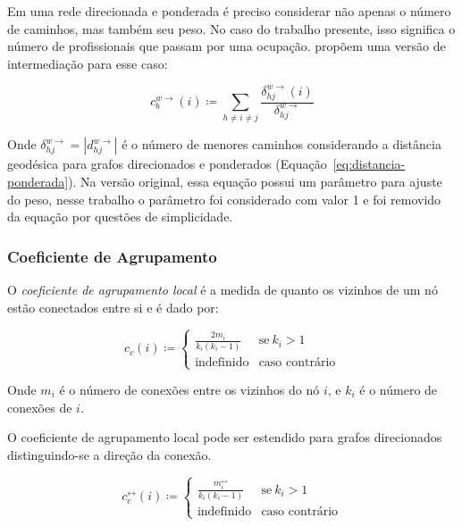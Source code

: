 \documentclass[12pt,a4paper]{article}
\theoremstyle{hypo}
\newcommand{\defn}{\coloneqq} %
\newcommand{\linkboth}[1]{#1^\leftrightarrow} %
\newcommand{\weighteddir}[1]{#1^{w\rightarrow}} %
\begin{document}
Em uma rede direcionada e ponderada é preciso considerar não apenas o número de caminhos, mas também seu peso. No caso do trabalho presente, isso significa o número de profissionais que passam por uma ocupação.  propõem uma versão de intermediação para esse caso:

\begin{equation}
\weighteddir{c}_{b}(i) \defn \sum_{h \neq i \neq j} \frac{\weighteddir{\delta}_{hj}(i)}{\weighteddir{\delta}_{hj}}
\end{equation}

Onde $\weighteddir{\delta}_{hj} = |\weighteddir{d}_{hj}|$ é o número de menores caminhos considerando a distância geodésica para grafos direcionados e ponderados (Equação~\ref{eq:distancia-ponderada}). Na versão original, essa equação possui um parâmetro para ajuste do peso, nesse trabalho o parâmetro foi considerado com valor 1 e foi removido da equação por questões de simplicidade.

\subsubsection{Coeficiente de Agrupamento} \label{sec:coeficiente-agrupamento}

O \textit{coeficiente de agrupamento local} é a medida de quanto os vizinhos de um nó estão conectados entre si e é dado por:

\begin{equation}
c_c(i) \defn \begin{cases}
    \frac{2m_i}{k_i(k_i - 1)} & \text{se}\ k_i > 1 \\
    \text{indefinido}         & \text{caso contrário}
  \end{cases}
\end{equation}

Onde $m_i$ é o número de conexões entre os vizinhos do nó $i$, e $k_i$ é o número de conexões de $i$.

O coeficiente de agrupamento local pode ser estendido para grafos direcionados distinguindo-se a direção da conexão.

\begin{equation}
\linkboth{c}_c(i) \defn \begin{cases}
    \frac{\linkboth{m}_i}{k_i(k_i - 1)} & \text{se}\ k_i > 1 \\
    \text{indefinido}                  & \text{caso contrário}
  \end{cases}
\end{equation}
\end{document}
